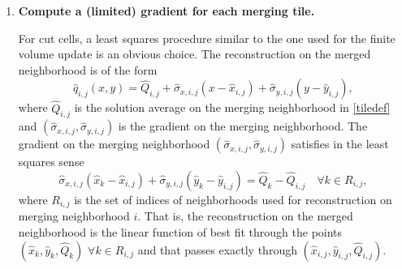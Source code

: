 \begin{enumerate}
\item
{\bf Compute a (limited) gradient for each merging
tile.}

\vspace*{.1in}
For cut cells, a least squares procedure  similar to the one used for
the finite volume update is an obvious choice. 
The reconstruction on the merged neighborhood is of the form
\begin{equation}
\widehat{q}_{i,j}(x,y) = \widehat{Q}_{i, j} + \widehat{\sigma}_{x,i,j}(x - \widehat{x}_{i,j}) + \widehat{\sigma}_{y,i,j}(y - \widehat{y}_{i,j}),
\end{equation}
where $\widehat{Q}_{i, j}$ is the solution average on the merging neighborhood in \eqref{tiledef} and $(\widehat{\sigma}_{x,i,j},\widehat{\sigma}_{y,i,j})$ is the gradient on the merging neighborhood.
The gradient on the merging neighborhood $(\widehat{\sigma}_{x,i,j},\widehat{\sigma}_{y,i,j})$ satisfies in the least squares sense
\begin{equation}
\widehat{\sigma}_{x,i,j}(\widehat{x}_{k} - \widehat{x}_{i,j}) + \widehat{\sigma}_{y,i,j}(\widehat{y}_{k} - \widehat{y}_{i,j})= \widehat{Q}_{k} - \widehat{Q}_{i, j} \quad \forall k \in R_{i,j},
\end{equation}
where $R_{i,j}$ is the set of indices of neighborhoods used for reconstruction 
on merging neighborhood $i$.  That is, the reconstruction on the merged neighborhood is the linear function of best fit through the points $(\widehat x_k, \widehat y_k, \widehat Q_k)$ $\forall k \in R_{i,j}$ and that passes exactly through $(\widehat x_{i,j}, \widehat y_{i,j}, \widehat{Q}_{i,j})$.




\end{enumerate}
